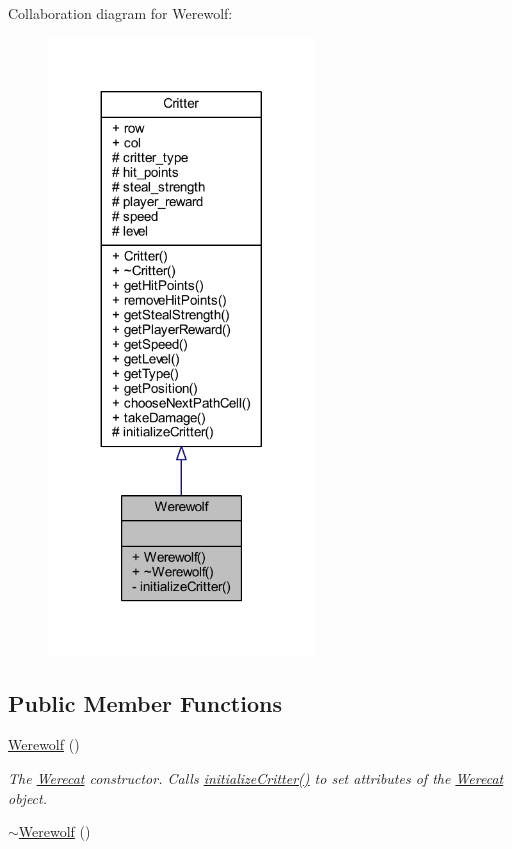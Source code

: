Collaboration diagram for Werewolf\+:
\nopagebreak
\begin{figure}[H]
\begin{center}
\leavevmode
\includegraphics[width=200pt]{class_werewolf__coll__graph}
\end{center}
\end{figure}
\subsection*{Public Member Functions}
\begin{DoxyCompactItemize}
\item 
\hyperlink{class_werewolf_a56f3c77343deae2f8c4e9c39eeaf9ef4}{Werewolf} ()
\begin{DoxyCompactList}\small\item\em The \hyperlink{class_werecat}{Werecat} constructor. Calls \hyperlink{class_werewolf_afc8553cf4e3e33a609ca08c084d66ce0}{initialize\+Critter()} to set attributes of the \hyperlink{class_werecat}{Werecat} object. \end{DoxyCompactList}\item 
\hyperlink{class_werewolf_afa77a1212c2df2e1302ac6d769c67076}{$\sim$\+Werewolf} ()
\end{DoxyCompactItemize}
